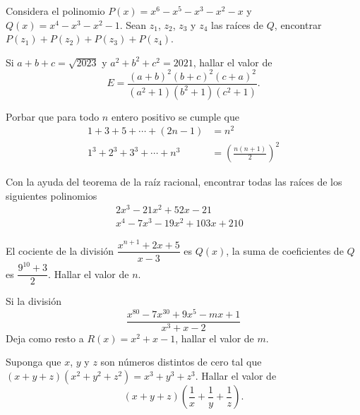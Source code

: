 \begin{section-problem}
    Considera el polinomio $P(x) = x^6 - x^5 - x^3 - x^2 - x$ y $Q(x) = x^4 - x^3 - x^2 - 1$.
    Sean $z_1$, $z_2$, $z_3$ y $z_4$ las raíces de $Q$, encontrar $P(z_1) + P(z_2) + P(z_3) + P(z_4)$.
\end{section-problem}



\begin{section-problem}
    Si $a + b + c = \sqrt{2023}$ y $a^2 + b^2 + c^2 = 2021$, hallar el valor de
    \[E = \frac{(a + b)^2 (b + c)^2 (c + a)^2}{(a^2 + 1) (b^2 + 1) (c^2 + 1)}.\]
\end{section-problem}

\begin{section-problem}
    Porbar que para todo $n$ entero positivo se cumple que
    \begin{align*}
        1 + 3 + 5 + \cdots + \left(2n - 1\right) &= n^2\\
        1^3 + 2^3 + 3^3  + \cdots + n^3 &= \left(\frac{n (n + 1)}{2}\right)^2
    \end{align*}
\end{section-problem}

\begin{section-problem}
    Con la ayuda del teorema de la raíz racional, encontrar todas las raíces de los siguientes polinomios
    \begin{align*}
        2 x^3 - 21 x^2 + 52 x - 21& \\
        x^4 - 7 x^3 - 19 x^2 + 103 x + 210&
    \end{align*}
\end{section-problem}

\begin{section-problem}
    El cociente de la división $\dfrac{x^{n + 1} + 2x + 5}{x - 3}$ es $Q(x)$, la suma de coeficientes de $Q$ es $\dfrac{9^{10} + 3}{2}$.
    Hallar el valor de $n$.
\end{section-problem}

\begin{section-problem}
    Si la división
    \[\frac{x^{80} - 7 x^{30} + 9x^5 - mx + 1}{x^3 + x - 2}\]
    Deja como resto a $R(x) = x^2 + x - 1$, hallar el valor de $m$.
\end{section-problem}

\begin{section-problem}
    Suponga que $x$, $y$ y $z$ son números distintos de cero tal que $(x + y + z)(x^2 + y^2 + z^2) = x^3 + y^3 + z^3$.
    Hallar el valor de
    \[(x + y + z)\left(\frac{1}{x} + \frac{1}{y} + \frac{1}{z}\right).\]
\end{section-problem}

